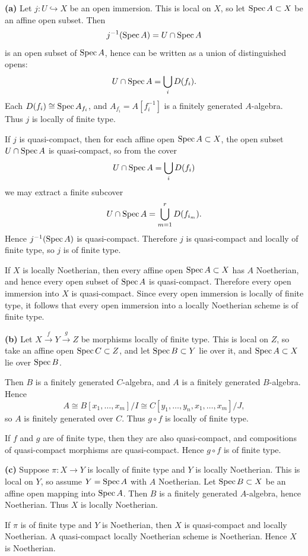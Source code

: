 \documentclass[12pt]{article}
\begin{document}
\begin{solution}
    \leavevmode

    \textbf{(a)}  Let $j:U \hookrightarrow X$ be an open immersion. This is local on $X$, so let $\operatorname{Spec} A \subset X$ be an affine open subset. Then
    \[
        j^{-1}(\operatorname{Spec} A)=U\cap \operatorname{Spec} A
    \]
    is an open subset of $\operatorname{Spec} A$, hence can be written as a union of distinguished opens:
    \[
        U\cap \operatorname{Spec} A=\bigcup_i D(f_i).
    \]
    Each $D(f_i)\cong \operatorname{Spec} A_{f_i}$, and $A_{f_i}=A[f_i^{-1}]$ is a finitely generated $A$-algebra. Thus $j$ is locally of finite type.

    If $j$ is quasi-compact, then for each affine open $\operatorname{Spec} A \subset X$, the open subset $U\cap \operatorname{Spec} A$ is quasi-compact, so from the cover
    \[
        U\cap \operatorname{Spec} A=\bigcup_i D(f_i)
    \]
    we may extract a finite subcover
    \[
        U\cap \operatorname{Spec} A=\bigcup_{m=1}^r D(f_{i_m}).
    \]
    Hence $j^{-1}(\operatorname{Spec} A)$ is quasi-compact. Therefore $j$ is quasi-compact and locally of finite type, so $j$ is of finite type.

    If $X$ is locally Noetherian, then every affine open $\operatorname{Spec} A \subset X$ has $A$ Noetherian, and hence every open subset of $\operatorname{Spec} A$ is quasi-compact. Therefore every open immersion into $X$ is quasi-compact. Since every open immersion is locally of finite type, it follows that every open immersion into a locally Noetherian scheme is of finite type.


    \textbf{(b)} Let $X \xrightarrow{f} Y \xrightarrow{g} Z$ be morphisms locally of finite type. This is local on $Z$, so take an affine open $\operatorname{Spec} C \subset Z$, and let $\operatorname{Spec} B \subset Y$ lie over it, and $\operatorname{Spec} A \subset X$ lie over $\operatorname{Spec} B$.

    Then $B$ is a finitely generated $C$-algebra, and $A$ is a finitely generated $B$-algebra. Hence
    \[
        A \cong B[x_1,\dots,x_m]/I \cong C[y_1,\dots,y_n,x_1,\dots,x_m]/J,
    \]
    so $A$ is finitely generated over $C$. Thus $g \circ f$ is locally of finite type.

    If $f$ and $g$ are of finite type, then they are also quasi-compact, and compositions of quasi-compact morphisms are quasi-compact. Hence $g \circ f$ is of finite type.

    \medskip

    \textbf{(c)} Suppose $\pi:X \to Y$ is locally of finite type and $Y$ is locally Noetherian. This is local on $Y$, so assume $Y=\operatorname{Spec} A$ with $A$ Noetherian. Let $\operatorname{Spec} B \subset X$ be an affine open mapping into $\operatorname{Spec} A$. Then $B$ is a finitely generated $A$-algebra, hence Noetherian. Thus $X$ is locally Noetherian.

    If $\pi$ is of finite type and $Y$ is Noetherian, then $X$ is quasi-compact and locally Noetherian. A quasi-compact locally Noetherian scheme is Noetherian. Hence $X$ is Noetherian.
\end{solution}
\end{document}
